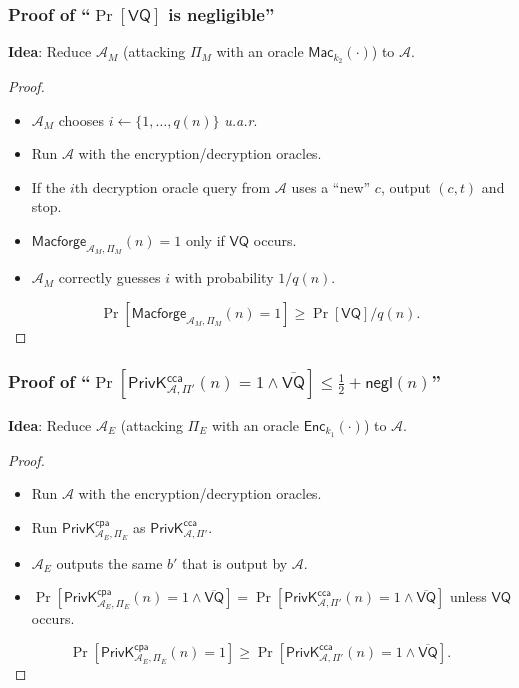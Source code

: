\begin{frame}\frametitle{Proof of ``$\Pr[\mathsf{VQ}]$ is negligible''}
\textbf{Idea}: Reduce $\mathcal{A}_M$ (attacking $\Pi_M$ with an oracle $\mathsf{Mac}_{k_2}(\cdot)$) to $\mathcal{A}$.
\begin{proof}
\begin{itemize}
\item $\mathcal{A}_M$ chooses $i \gets \{1,\dotsc,q(n)\}$ \emph{u.a.r}.
\item Run $\mathcal{A}$ with the encryption/decryption oracles.
\item If the $i$th decryption oracle query from $\mathcal{A}$ uses a ``new'' $c$, output $(c,t)$ and stop.
\item $\mathsf{Macforge}_{\mathcal{A}_M,\Pi_M }(n)=1$ only if $\mathsf{VQ}$ occurs.
\item $\mathcal{A}_M$ correctly guesses $i$ with probability $1/q(n)$.
\end{itemize}
\[ \Pr [\mathsf{Macforge}_{\mathcal{A}_M,\Pi_M }(n)=1] \ge \Pr[\mathsf{VQ}]/q(n).
\]
\end{proof}
\end{frame}
\begin{frame}\frametitle{Proof of ``$\Pr[\mathsf{PrivK}^{\mathsf{cca}}_{\mathcal{A},\Pi'}(n)=1 \land \overline{\mathsf{VQ}}] \le \frac{1}{2} + \mathsf{negl}(n)$''}
\textbf{Idea}: Reduce $\mathcal{A}_E$ (attacking $\Pi_E$ with an oracle $\mathsf{Enc}_{k_1}(\cdot)$) to $\mathcal{A}$.
\begin{proof}
\begin{itemize}
\item Run $\mathcal{A}$ with the encryption/decryption oracles.
\item Run $\mathsf{PrivK}^{\mathsf{cpa}}_{\mathcal{A}_E,\Pi_E}$ as $\mathsf{PrivK}^{\mathsf{cca}}_{\mathcal{A},\Pi'}$.
\item $\mathcal{A}_E$ outputs the same $b'$ that is output by $\mathcal{A}$.
\item $\Pr[\mathsf{PrivK}^{\mathsf{cpa}}_{\mathcal{A}_E,\Pi_E}(n)=1 \land \overline{\mathsf{VQ}}] = \Pr[\mathsf{PrivK}^{\mathsf{cca}}_{\mathcal{A},\Pi'}(n)=1 \land \overline{\mathsf{VQ}}]$ unless $\mathsf{VQ}$ occurs.
\end{itemize}
\[ \Pr [\mathsf{PrivK}^{\mathsf{cpa}}_{\mathcal{A}_E,\Pi_E }(n)=1] \ge \Pr[\mathsf{PrivK}^{\mathsf{cca}}_{\mathcal{A},\Pi'}(n)=1 \land \overline{\mathsf{VQ}}].
\]
\end{proof}
\end{frame}
